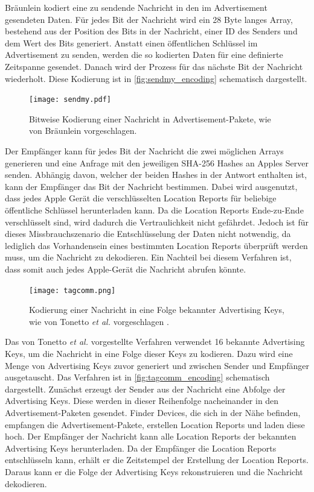 Bräunlein \cite{braeunlein_sendmy} kodiert eine zu sendende Nachricht in den im Advertisement gesendeten Daten.
Für jedes Bit der Nachricht wird ein 28 Byte langes Array, bestehend aus der Position des Bits in der Nachricht, einer ID des Senders und dem Wert des Bits generiert.
Anstatt einen öffentlichen Schlüssel im Advertisement zu senden, werden die so kodierten Daten für eine definierte Zeitspanne gesendet.
Danach wird der Prozess für das nächste Bit der Nachricht wiederholt.
Diese Kodierung ist in \autoref{fig:sendmy_encoding} schematisch dargestellt.
\begin{figure}[ht]
  \centering
  \texttt{[image: sendmy.pdf]}
  \caption{Bitweise Kodierung einer Nachricht in Advertisement-Pakete, wie von Bräunlein vorgeschlagen.}
  \label{fig:sendmy_encoding}
\end{figure}
Der Empfänger kann für jedes Bit der Nachricht die zwei möglichen Arrays generieren und eine Anfrage mit den jeweiligen \ac{SHA}-256 Hashes an Apples Server senden.
Abhängig davon, welcher der beiden Hashes in der Antwort enthalten ist, kann der Empfänger das Bit der Nachricht bestimmen.
Dabei wird ausgenutzt, dass jedes Apple Gerät die verschlüsselten Location Reports für beliebige öffentliche Schlüssel herunterladen kann.
Da die Location Reports Ende-zu-Ende verschlüsselt sind, wird dadurch die Vertraulichkeit nicht gefährdet.
Jedoch ist für dieses Missbrauchszenario die Entschlüsselung der Daten nicht notwendig, da lediglich das Vorhandensein eines bestimmten Location Reports überprüft werden muss, um die Nachricht zu dekodieren.
Ein Nachteil bei diesem Verfahren ist, dass somit auch jedes Apple-Gerät die Nachricht abrufen könnte.

\begin{figure}[ht]
  \centering
  \texttt{[image: tagcomm.png]}
  \caption{Kodierung einer Nachricht in eine Folge bekannter Advertising Keys, wie von Tonetto \textit{et al.} vorgeschlagen \cite{Tonetto_FindMy}.}
  \label{fig:tagcomm_encoding}
\end{figure}
Das von Tonetto \textit{et al.} \cite{Tonetto_FindMy} vorgestellte Verfahren verwendet 16 bekannte Advertising Keys, um die Nachricht in eine Folge dieser Keys zu kodieren.
Dazu wird eine Menge von Advertising Keys zuvor generiert und zwischen Sender und Empfänger ausgetauscht.
Das Verfahren ist in \autoref{fig:tagcomm_encoding} schematisch dargestellt.
Zunächst erzeugt der Sender aus der Nachricht eine Abfolge der Advertising Keys.
Diese werden in dieser Reihenfolge nacheinander in den Advertisement-Paketen gesendet.
Finder Devices, die sich in der Nähe befinden, empfangen die Advertisement-Pakete, erstellen Location Reports und laden diese hoch.
Der Empfänger der Nachricht kann alle Location Reports der bekannten Advertising Keys herunterladen.
Da der Empfänger die Location Reports entschlüsseln kann, erhält er die Zeitstempel der Erstellung der Location Reports.
Daraus kann er die Folge der Advertising Keys rekonstruieren und die Nachricht dekodieren.

